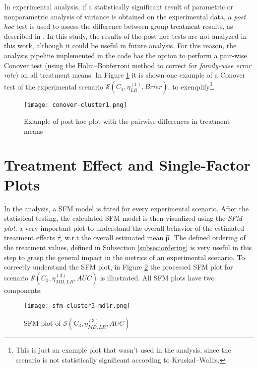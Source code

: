 In experimental analysis, if a statistically significant result of parametric or nonparametric analysis of variance is obtained on the experimental data, a \textit{post hoc} test is used to assess the difference between group treatment results, as described in \cite{Terpilowski2019}. In this study, the results of the post hoc tests are not analyzed in this work, although it could be useful in future analysis. For this reason, the analysis pipeline implemented in the code has the option to perform a pair-wise Conover test (using the Holm–Bonferroni method to correct for \textit{family-wise error rate}) on all treatment means. In Figure \ref{fig:posthoc-conover} it is shown one example of a Conover test of the experimental scenario $\mathcal{S}(C_1, \eta^{(1)}_{LR}, Brier)$, to exemplify\footnote{This is just an example plot that wasn't used in the analysis, since the scenario is not statistically significant according to Kruskal–Wallis.}.

\begin{figure}[H]
    \centering
    \texttt{[image: conover-cluster1.png]} 
    \caption{Example of post hoc plot with the pairwise differences in treatment means}
    \label{fig:posthoc-conover}
\end{figure}

\section{Treatment Effect and Single-Factor Plots}

In the analysis, a SFM model is fitted for every experimental scenario. After the statistical testing, the calculated SFM model is then visualized using the \textit{SFM plot}, a very important plot to understand the overall behavior of the estimated treatment effects $\hat{\tau_i}$ w.r.t the overall estimated mean $\hat{\bm{\mu}}$. The defined ordering of the treatment values, defined in Subsection \ref{subsec:ordering} is very useful in this step to grasp the general impact in the metrics of an experimental scenario. To correctly understand the SFM plot, in Figure \ref{fig:sfm-plot-c3-mdlr} the processed SFM plot for scenario $\mathcal{S}(C_3, \eta^{(3)}_{MD, LR}, AUC)$ is illustrated. All SFM plots have two components:

\begin{figure}[H]
    \centering
    \texttt{[image: sfm-cluster3-mdlr.png]} 
    \caption{SFM plot of  $\mathcal{S}(C_3, \eta^{(3)}_{MD, LR}, AUC)$}
    \label{fig:sfm-plot-c3-mdlr}
\end{figure}


